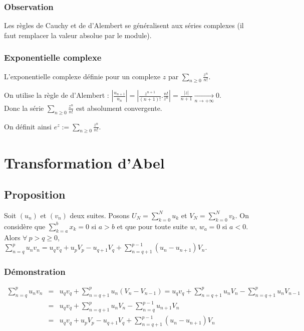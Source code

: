 \documentclass[a4paper,10pt]{book} %
\newcommand{\displayAmath}{\displaystyle}
\begin{document}
\subsubsection{Observation}
Les règles de Cauchy et de d'Alembert se généralisent aux séries complexes (il faut remplacer la valeur absolue par le module).

\subsubsection{Exponentielle complexe}
L'exponentielle complexe définie pour un complexe $z$ par $\sum_{n\geq 0}\frac{z^n}{n!}$.\smallskip

On utilise la règle de d'Alembert : $|\frac{u_{n+1}}{u_n}|=|\frac{z^{n+1}}{(n+1)!}.
\frac{n!}{z^n}|=\frac{|z|}{n+1}\underset{n\rightarrow +\infty}{\rightarrow}0$.\\
Donc la série $\sum_{n\geq 0}\frac{z^n}{n!}$ est absolument convergente.\smallskip

On définit ainsi $e^z:=\sum_{n\geq 0}\frac{z^n}{n!}$.

\section{Transformation d'Abel}
\subsection{Proposition}
Soit $(u_n)$ et $(v_n)$ deux suites. Posons $\displayAmath U_N=\sum_{k=0}^N u_k$ et $\displayAmath V_N=\sum_{k=0}^N v_k$. On considère que $\displayAmath\sum_{k=a}^b x_{k}=0$ si $a>b$ et que pour toute suite $w$, $w_a=0$ si $a<0$.\\
Alors $\forall~p>q\geq 0$, $\displayAmath\sum_{n=q}^pu_nv_n=u_qv_q+u_pV_p-u_{q+1}V_q+\sum_{n=q+1}^{p-1}(u_n-u_{n+1})V_n$.

\subsubsection{Démonstration}
$\begin{array}{rcl}\displayAmath\sum_{n=q}^p u_nv_n&=&\displayAmath u_qv_q+\sum_{n=q+1}^p u_n(V_n-V_{n-1})=u_qv_q+\sum_{n=q+1}^p u_nV_n-\sum_{n=q+1}^pu_nV_{n-1} \\
&=&\displayAmath u_qv_q+ \sum_{n=q+1}^pu_nV_n-\sum_{n=q}^{p-1}u_{n+1}V_n\\
&=&\displayAmath u_qv_q+u_pV_p-u_{q+1}V_q+ \sum_{n=q+1}^{p-1}(u_n-u_{n+1})V_n \end{array}$
\end{document}
